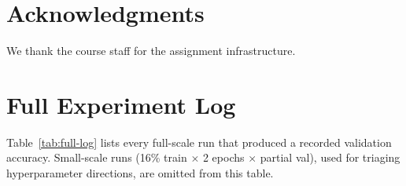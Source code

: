 \documentclass[11pt]{article}
\begin{document}
\section*{Acknowledgments}

We thank the course staff for the assignment infrastructure.



\appendix

\section{Full Experiment Log}

Table~\ref{tab:full-log} lists every full-scale run that produced a recorded validation accuracy. Small-scale runs (16\% train $\times$ 2 epochs $\times$ partial val), used for triaging hyperparameter directions, are omitted from this table.
\end{document}
